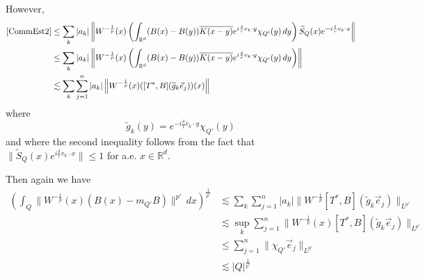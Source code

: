 \documentclass[12pt,reqno ]{amsart}
\numberwithin{equation}{section}
\theoremstyle{definition}
\newcommand{\Rd}{\ensuremath{\mathbb{R}^d}}
\newcommand{\inrd}{\ensuremath{\int_{\Rd}}}
\newcommand{\W}[1]{\ensuremath{\widetilde{#1}}}
\begin{document}
However, \begin{align*} \eqref{CommEst2} &  \leq \sum_k |a_k| \left\|  W^{-\frac{1}{p}} (x) \left(\inrd (B(x) - B(y)) \overline{K(x - y)}  e^{ i \frac{\delta}{r} v_k \cdot y}   \chi_{Q'} (y) \, dy \right)\W{S}_Q (x)  e^{ -i \frac{\delta}{r} v_k \cdot x} \right\|  \\ & \leq  \sum_k |a_k| \left\|  W^{-\frac{1}{p}} (x) \left(\inrd (B(x) - B(y)) \overline{K(x - y)}  e^{ i \frac{\delta}{r} v_k \cdot y}   \chi_{Q'} (y) \, dy \right) \right\|
 \\ & \lesssim  \sum_k  \sum_{j = 1}^n |a_k| \left\|  W^{-\frac{1}{p}} (x) ([T^*, B] (\W{g}_k \vec{e}_j)) (x)  \right\| \end{align*} where \begin{equation*} \W{g}_k (y) =   e^{- i \frac{\delta}{r} v_k \cdot y }  \chi_{Q'} (y) \end{equation*}  and where the second inequality follows from the fact that $\| \W{S}_Q(x)  e^{ i \frac{\delta}{r} v_k \cdot x }\| \leq 1$ for a.e. $x \in \Rd$.

Then again we have \begin{align*} \left(\int_{Q} \|  W^{-\frac{1}{p}} (x) (B(x) - m_{Q'} B ) \| ^{p'} \, dx \right) ^{\frac{1}{p'}} &  \lesssim \sum_k \sum_{j = 1}^n |a_k| \| W^{-\frac{1}{p}} [T^*, B] (\W{g}_k \vec{e}_j)  \|_{L^{p'}}  \\ & \lesssim   \sup_k  \sum_{j = 1}^n \| W^{-\frac{1}{p}} (x) [T^*, B] (\W{g}_k \vec{e}_j)  \|_{L^{p'}} \\ & \leq \sum_{j = 1}^n \|\chi_{Q'}  \vec{e}_j\|_{L^{p'}} \\ & \lesssim   |Q|^\frac{1}{p'}  \end{align*}
\end{document}
